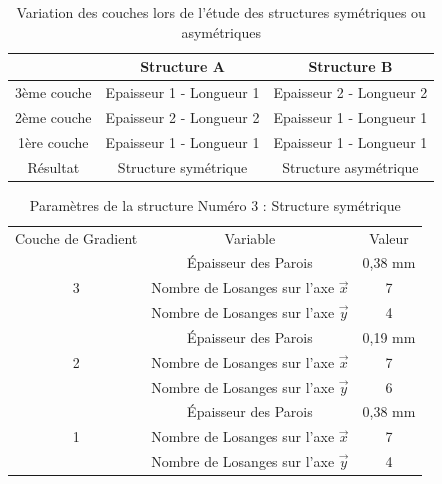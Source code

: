 \documentclass[a4paper]{article}
\begin{document}
	\begin{table}[H]
		\centering
		\begin{tabular}{|c|c|c|}
			\hline
			\rowcolor{Gray}
			 & \textbf{Structure A} & \textbf{Structure B} \\
			\hline
			3ème couche & \textcolor[rgb]{0,0.5,0}{Epaisseur 1 - Longueur 1} & \textcolor[rgb]{1,0,0}{Epaisseur 2 - Longueur 2} \\
			\hline
			2ème couche & \textcolor[rgb]{1,0,0}{Epaisseur 2 - Longueur 2} & \textcolor[rgb]{0,0.5,0}{Epaisseur 1 - Longueur 1} \\
			\hline
			1ère couche & \textcolor[rgb]{0,0.5,0}{Epaisseur 1 - Longueur 1} & \textcolor[rgb]{0,0.5,0}{Epaisseur 1 - Longueur 1} \\
			\hline
			Résultat & Structure symétrique & Structure asymétrique \\
			\hline
		\end{tabular}
		\caption{Variation des couches lors de l'étude des structures symétriques ou asymétriques}
	\end{table}

	\begin{table}[H]
		\centering
		\begin{tabular}{|c|c|c|}
			\hline
			\rowcolor{Gray}
			\multicolumn{3}{c}{Structure Symétrique : Structure 3}\\\hline
			\rowcolor{Gray}
			Couche de Gradient & Variable & Valeur\\
			\hline\hline
			& \textcolor[rgb]{0,0.5,0}{Épaisseur des Parois} & \textcolor[rgb]{0,0.5,0}{0,38 mm}\\
			\textcolor[rgb]{0,0.5,0}{3} & \textcolor[rgb]{0,0.5,0}{Nombre de Losanges sur l'axe $\vec{x}$} & \textcolor[rgb]{0,0.5,0}{7}\\
			& \textcolor[rgb]{0,0.5,0}{Nombre de Losanges sur l'axe $\vec{y}$} & \textcolor[rgb]{0,0.5,0}{4}\\
			\hline
			& \textcolor[rgb]{1,0,0}{Épaisseur des Parois} & \textcolor[rgb]{1,0,0}{0,19 mm}\\
			\textcolor[rgb]{1,0,0}{2} & \textcolor[rgb]{1,0,0}{Nombre de Losanges sur l'axe $\vec{x}$} & \textcolor[rgb]{1,0,0}{7}\\
			& \textcolor[rgb]{1,0,0}{Nombre de Losanges sur l'axe $\vec{y}$} & \textcolor[rgb]{1,0,0}{6}\\
			\hline
			& \textcolor[rgb]{0,0.5,0}{Épaisseur des Parois} & \textcolor[rgb]{0,0.5,0}{0,38 mm}\\
			\textcolor[rgb]{0,0.5,0}{1} & \textcolor[rgb]{0,0.5,0}{Nombre de Losanges sur l'axe $\vec{x}$} & \textcolor[rgb]{0,0.5,0}{7}\\
			& \textcolor[rgb]{0,0.5,0}{Nombre de Losanges sur l'axe $\vec{y}$} & \textcolor[rgb]{0,0.5,0}{4}\\
			\hline
		\end{tabular}
		\caption{Paramètres de la structure Numéro 3 : Structure symétrique}
	\end{table}
	
\end{document}
